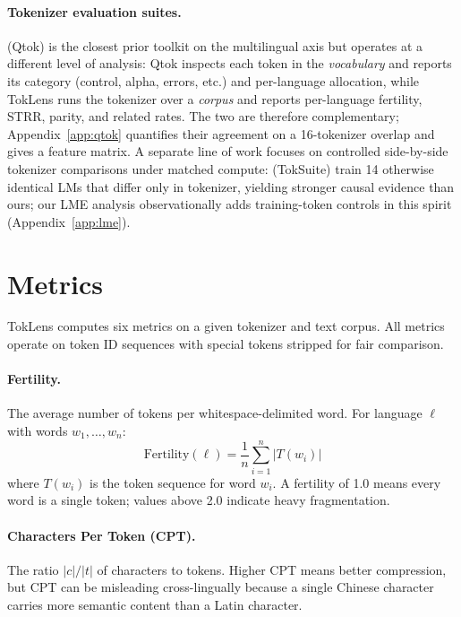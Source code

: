 \documentclass[11pt]{article}
\begin{document}
\paragraph{Tokenizer evaluation suites.} \citet{chelombitko2024qtok} (Qtok) is the closest prior toolkit on the multilingual axis but operates at a different level of analysis: Qtok inspects each token in the \emph{vocabulary} and reports its category (control, alpha, errors, etc.) and per-language allocation, while TokLens runs the tokenizer over a \emph{corpus} and reports per-language fertility, STRR, parity, and related rates. The two are therefore complementary; Appendix~\ref{app:qtok} quantifies their agreement on a 16-tokenizer overlap and gives a feature matrix. A separate line of work focuses on controlled side-by-side tokenizer comparisons under matched compute: \citet{altintas2025toksuite} (TokSuite) train 14 otherwise identical LMs that differ only in tokenizer, yielding stronger causal evidence than ours; our LME analysis observationally adds training-token controls in this spirit (Appendix~\ref{app:lme}).

\section{Metrics}
\label{sec:metrics}

TokLens computes six metrics on a given tokenizer and text corpus. All metrics operate on token ID sequences with special tokens stripped for fair comparison.

\paragraph{Fertility.} The average number of tokens per whitespace-delimited word. For language $\ell$ with words $w_1, \ldots, w_n$:
\begin{equation}
    \text{Fertility}(\ell) = \frac{1}{n}\sum_{i=1}^{n} |T(w_i)|
\end{equation}
where $T(w_i)$ is the token sequence for word $w_i$. A fertility of 1.0 means every word is a single token; values above 2.0 indicate heavy fragmentation.

\paragraph{Characters Per Token (CPT).} The ratio $|c| / |t|$ of characters to tokens. Higher CPT means better compression, but CPT can be misleading cross-lingually because a single Chinese character carries more semantic content than a Latin character.
\end{document}
